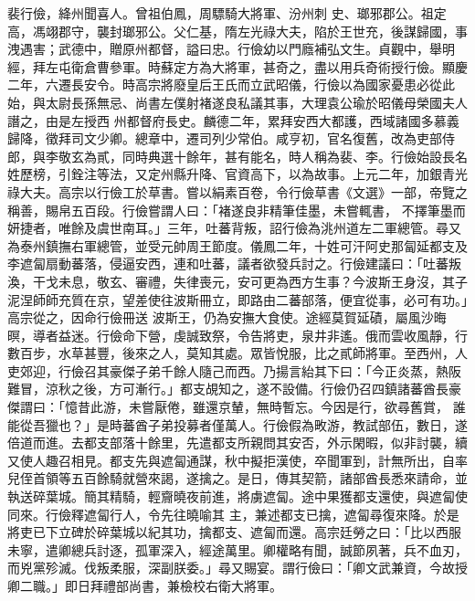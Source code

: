 \begin{pinyinscope}
 裴行儉，絳州聞喜人。曾祖伯鳳，周驃騎大將軍、汾州刺
 史、瑯邪郡公。祖定高，馮翊郡守，襲封瑯邪公。父仁基，隋左光祿大夫，陷於王世充，後謀歸國，事洩遇害；武德中，贈原州都督，謚曰忠。行儉幼以門廕補弘文生。貞觀中，舉明經，拜左屯衛倉曹參軍。時蘇定方為大將軍，甚奇之，盡以用兵奇術授行儉。顯慶二年，六遷長安令。時高宗將廢皇后王氏而立武昭儀，行儉以為國家憂患必從此始，與太尉長孫無忌、尚書左僕射褚遂良私議其事，大理袁公瑜於昭儀母榮國夫人譖之，由是左授西
 州都督府長史。麟德二年，累拜安西大都護，西域諸國多慕義歸降，徵拜司文少卿。總章中，遷司列少常伯。咸亨初，官名復舊，改為吏部侍郎，與李敬玄為貳，同時典選十餘年，甚有能名，時人稱為裴、李。行儉始設長名姓歷榜，引銓注等法，又定州縣升降、官資高下，以為故事。上元二年，加銀青光祿大夫。高宗以行儉工於草書。嘗以絹素百卷，令行儉草書《文選》一部，帝覽之稱善，賜帛五百段。行儉嘗謂人曰：「褚遂良非精筆佳墨，未嘗輒書，
 不擇筆墨而妍捷者，唯餘及虞世南耳。」三年，吐蕃背叛，詔行儉為洮州道左二軍總管。尋又為泰州鎮撫右軍總管，並受元帥周王節度。儀鳳二年，十姓可汗阿史那匐延都支及李遮匐扇動蕃落，侵逼安西，連和吐蕃，議者欲發兵討之。行儉建議曰：「吐蕃叛渙，干戈未息，敬玄、審禮，失律喪元，安可更為西方生事？今波斯王身沒，其子泥涅師師充質在京，望差使往波斯冊立，即路由二蕃部落，便宜從事，必可有功。」高宗從之，因命行儉冊送
 波斯王，仍為安撫大食使。途經莫賀延磧，屬風沙晦暝，導者益迷。行儉命下營，虔誠致祭，令告將吏，泉井非遙。俄而雲收風靜，行數百步，水草甚豐，後來之人，莫知其處。眾皆悅服，比之貳師將軍。至西州，人吏郊迎，行儉召其豪傑子弟千餘人隨己而西。乃揚言紿其下曰：「今正炎蒸，熱阪難冒，涼秋之後，方可漸行。」都支覘知之，遂不設備。行儉仍召四鎮諸蕃酋長豪傑謂曰：「憶昔此游，未嘗厭倦，雖還京輦，無時暫忘。今因是行，欲尋舊賞，
 誰能從吾獵也？」是時蕃酋子弟投募者僅萬人。行儉假為畋游，教試部伍，數日，遂倍道而進。去都支部落十餘里，先遣都支所親問其安否，外示閑暇，似非討襲，續又使人趣召相見。都支先與遮匐通謀，秋中擬拒漢使，卒聞軍到，計無所出，自率兒侄首領等五百餘騎就營來謁，遂擒之。是日，傳其契箭，諸部酋長悉來請命，並執送碎葉城。簡其精騎，輕齎曉夜前進，將虜遮匐。途中果獲都支還使，與遮匐使同來。行儉釋遮匐行人，令先往曉喻其
 主，兼述都支已擒，遮匐尋復來降。於是將吏已下立碑於碎葉城以紀其功，擒都支、遮匐而還。高宗廷勞之曰：「比以西服未寧，遣卿總兵討逐，孤軍深入，經途萬里。卿權略有聞，誠節夙著，兵不血刃，而兇黨殄滅。伐叛柔服，深副朕委。」尋又賜宴。謂行儉曰：「卿文武兼資，今故授卿二職。」即日拜禮部尚書，兼檢校右衛大將軍。




\end{pinyinscope}
